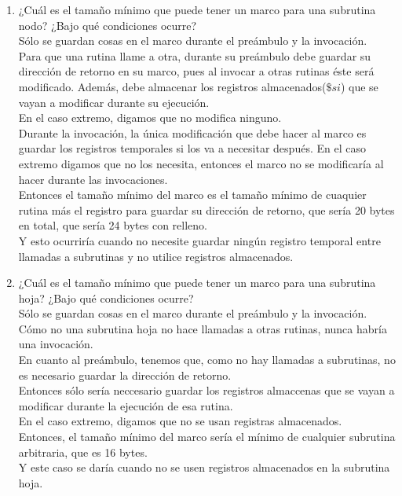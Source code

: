 \documentclass{article}
\begin{document}
\begin{enumerate}
{		\begin{enumerate}
			\item {
			¿Cuál es el tamaño mínimo que puede tener un marco para una 
			subrutina nodo? ¿Bajo qué condiciones ocurre?\\
			Sólo se guardan cosas en el marco durante el preámbulo y la 
			invocación.\\
			Para que una rutina llame a otra, durante su preámbulo debe guardar 
			su dirección de retorno en su marco, pues al invocar a otras rutinas
			éste será modificado. Además, debe almacenar los registros
			almacenados($\$si$) que se vayan a modificar durante su ejecución.\\
			En el caso extremo, digamos que no modifica ninguno.\\
			Durante la invocación, la única modificación que debe hacer al marco
			es guardar los registros temporales si los va a necesitar después.
			En el caso extremo digamos que no los necesita, entonces el marco 
			no se modificaría al hacer durante las invocaciones.\\
			Entonces el tamaño mínimo del marco es el tamaño mínimo de cuaquier
			rutina más el registro para guardar su dirección de retorno, que 
			sería 20 bytes en total, que sería 24 bytes con relleno.\\
			Y esto ocurriría cuando no necesite guardar ningún registro temporal
			entre llamadas a subrutinas y no utilice registros almacenados.
			}
			\item {
			¿Cuál es el tamaño mínimo que puede tener un marco para una 
			subrutina hoja? ¿Bajo qué condiciones ocurre?\\
			Sólo se guardan cosas en el marco durante el preámbulo y la 
			invocación.\\
			Cómo no una subrutina hoja no hace llamadas a otras rutinas, nunca 
			habría una invocación.\\
			En cuanto al preámbulo, tenemos que, como no hay llamadas a
			subrutinas, no es necesario guardar la dirección de retorno.\\
			Entonces sólo sería neccesario guardar los registros almaccenas que 
			se vayan a modificar durante la ejecución de esa rutina.\\
			En el caso extremo, digamos que no se usan registras almacenados.\\
			Entonces, el tamaño mínimo del marco sería el mínimo de cualquier
			subrutina arbitraria, que es 16 bytes.\\
			Y este caso se daría cuando no se usen registros almacenados en la
			subrutina hoja.
			}
		\end{enumerate}
		
}
\end{enumerate}
\end{document}
